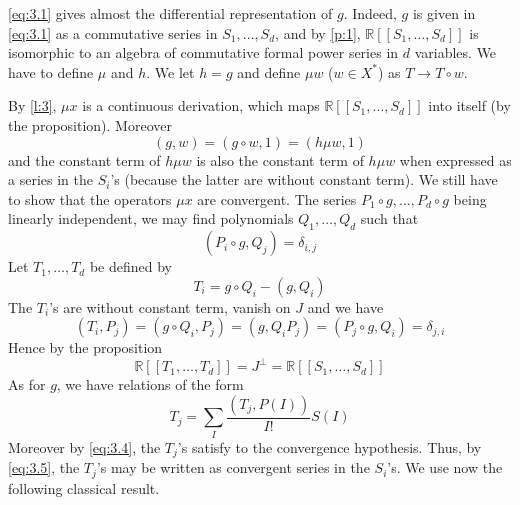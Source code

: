 \documentclass[a4paper,12pt]{article}
\newcommand{\R}{\mathbb{R}}
\begin{document}
\eqref{eq:3.1} gives almost the differential representation of $g$. Indeed, $g$ is given in \eqref{eq:3.1} as a commutative series in $S_1, \ldots, S_d$, and by \cref{p:1}, $\R \left[\left[{S}_1, \ldots, {S}_{{d}}\right]\right]$ is isomorphic to an algebra of commutative formal power series in $d$ variables. We have to define $\mu$ and $h$. 
We let ${h}={g}$ and define $\mu w$ ($w \in {X}^*$) as ${T} \rightarrow {T} \circ {w}$.

By \cref{l:3}, $\mu {x}$ is a continuous derivation, which maps $\R[[S_1,\dotsc,S_d]]$ into itself (by the proposition). Moreover
\begin{equation*}
	({g}, {w})=({g} \circ {w}, 1)=({h} \mu {w}, 1)
\end{equation*}
and the constant term of ${h} \mu w$ is also the constant term of ${h} \mu {{w}}$ when expressed as a series in the ${S}_i$'s (because the latter are without constant term).
We still have to show that the operators $\mu {x}$ are convergent. The series $P_1 \circ {g}, \ldots, P_d \circ {g}$ being linearly independent, we may find polynomials $Q_1, \ldots, Q_d$ such that
\begin{equation*}
	\left(P_i \circ g, Q_j\right)=\delta_{i, j}
\end{equation*}
Let ${T}_1, \ldots, {T}_{{d}}$ be defined by
\begin{equation*} \label{eq:3.4} \tag{4}
	T_i=g \circ Q_i-\left(g, Q_i\right)
\end{equation*}
The $T_i$'s are without constant term, vanish on $J$ and we have
\begin{equation*}
	\left(T_i, P_j\right)=\left(g \circ Q_i, P_j\right)=\left(g, Q_i P_j\right)=\left(P_j \circ g, Q_i\right)=\delta_{j, i}
\end{equation*}
Hence by the proposition
\begin{equation*}
	\R\left[\left[{T}_1, \ldots, {T}_{{d}}\right]\right]={J}^{\perp}=\R\left[\left[{S}_1, \ldots, {S}_{{d}}\right]\right]
\end{equation*}
As for $g$, we have relations of the form
\begin{equation*} \label{eq:3.5} \tag{5}
	T_j=\sum_I \frac{\left(T_j, P(I)\right)}{I !} S(I)
\end{equation*}
Moreover by \eqref{eq:3.4}, the ${T}_{{j}}$'s satisfy to the convergence hypothesis.
Thus, by \eqref{eq:3.5}, the $T_j$'s may be written as convergent series in the $S_i$'s.
We use now the following classical result.
\end{document}
